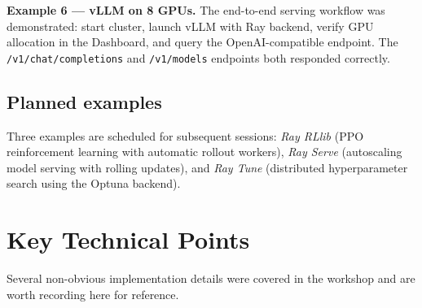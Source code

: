 \documentclass[12pt,a4paper]{article}
\begin{document}
\textbf{Example 6 --- vLLM on 8 GPUs.}
The end-to-end serving workflow was demonstrated: start cluster, launch
vLLM with Ray backend, verify GPU allocation in the Dashboard, and
query the OpenAI-compatible endpoint. The \texttt{/v1/chat/completions}
and \texttt{/v1/models} endpoints both responded correctly.

\subsection{Planned examples}

Three examples are scheduled for subsequent sessions:
\textit{Ray RLlib} (PPO reinforcement learning with automatic rollout
workers), \textit{Ray Serve} (autoscaling model serving with rolling
updates), and \textit{Ray Tune} (distributed hyperparameter search
using the Optuna backend).

\section{Key Technical Points}

Several non-obvious implementation details were covered in the
workshop and are worth recording here for reference.
\end{document}
